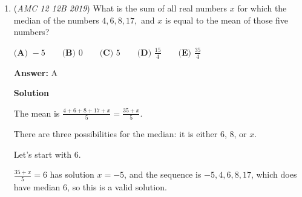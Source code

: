 \begin{enumerate}
 



\textbf{Solution 5 (kinda bashy quadratics)}

Since $AB$ has a length of $10$, the height must be $10$ as well for the area to be $50$, so we can drop an altitude from $C$ that has length $10$, and call the foot of the altitude on $AB$ as $D$. Let $AD$ have length $x$, so $BD$ must have length $10-x$. From the Pythagorean Theorem, $AC$ has length $\sqrt{x^2+100}$ and $BC$ has length $\sqrt{(10-x)^2+100}$. For the perimeter to be $50$, $10+\sqrt{x^2+100}+\sqrt{(10-x)^2+100}=50$, so $40-\sqrt{x^2+100}=\sqrt{(10-x)^2+100}$. Squaring both sides and simplifying, $1600-80\sqrt{x^2+100}=-20x+100$. We can rearrange this and divide all sides by $10$ to get $150+2x=8\sqrt{x^2+100}$. Squaring both sides yet again, rearranging, and simplifying some more, we get the quadratic $3x^2-30x-805=0$. So, from the quadratic formula, $x = \frac{30+\sqrt{900+4\cdot3\cdot805}}{6}$ or $x = \frac{30-\sqrt{900+4\cdot3\cdot805}}{6}$. Immediately we can rule out the negative solution (it's negative because the square root of the discriminant is greater than $30$, and we'll use this later too), as $x$ must be a positive number since it is a length. However, for the positive solution, we see that the discriminant is greater than $900$, so the square root is greater than $30$, so the entire expression when divided by $6$ for $x$ is greater than $10$, but this is not possible because $x$ should be less than $10$. Therefore, the number of possibilities is $\boxed{\textbf{(A) }0}$.

 


	\item (\textit{AMC 12 12B 2019}) What is the sum of all real numbers $x$ for which the median of the numbers $4,6,8,17,$ and $x$ is equal to the mean of those five numbers?


 $\textbf{(A) } -5 \qquad\textbf{(B) } 0 \qquad\textbf{(C) } 5 \qquad\textbf{(D) } \frac{15}{4} \qquad\textbf{(E) } \frac{35}{4}$

 \textbf{Answer: }A



\textbf{Solution}

The mean is $\frac{4+6+8+17+x}{5}=\frac{35+x}{5}$.

 There are three possibilities for the median: it is either $6$, $8$, or $x$.

 Let's start with $6$.

 $\frac{35+x}{5}=6$ has solution $x=-5$, and the sequence is $-5, 4, 6, 8, 17$, which does have median $6$, so this is a valid solution.


\end{enumerate}
